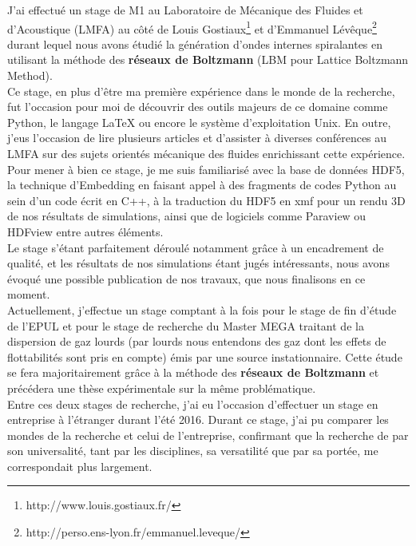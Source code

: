 \documentclass[french, lmr]{article}
\begin{document}
\hspace{4 mm }J'ai effectué un stage de M1 au Laboratoire de Mécanique des Fluides et d'Acoustique (\textsc{LMFA}) au côté de Louis Gostiaux\footnote{http://www.louis.gostiaux.fr/} et d'Emmanuel Lévêque\footnote{http://perso.ens-lyon.fr/emmanuel.leveque/} durant lequel nous avons étudié la génération d'ondes internes spiralantes en utilisant la méthode des \textbf{réseaux de Boltzmann} (LBM pour Lattice Boltzmann Method). \\ 
Ce stage, en plus d'être ma première expérience dans le monde de la recherche, fut l'occasion pour moi de découvrir des outils majeurs de ce domaine comme Python, le langage \LaTeX $ $ ou encore le système d'exploitation Unix. En outre, j'eus l'occasion de lire plusieurs articles et d'assister à diverses conférences au LMFA sur des sujets orientés mécanique des fluides enrichissant cette expérience. \\ 
Pour mener à bien ce stage, je me suis familiarisé avec la base de données \textsc{HDF5}, la technique d'Embedding en faisant appel à des fragments de codes Python au sein d'un code écrit en C++, à la traduction du \textsc{HDF5} en xmf pour un rendu 3D de nos résultats de simulations, ainsi que de logiciels comme Paraview ou HDFview entre autres éléments.\\
 Le stage s'étant parfaitement déroulé notamment grâce à un encadrement de qualité, et les résultats de nos simulations étant jugés intéressants, nous avons évoqué une possible publication de nos travaux, que nous finalisons en ce moment. \\
Actuellement, j'effectue un stage comptant à la fois pour le stage de fin d'étude de l'\textsc{EPUL} et pour le stage de recherche du Master \textsc{MEGA} traitant de la dispersion de gaz lourds (par lourds nous entendons des gaz dont les effets de flottabilités sont pris en compte) émis par une source instationnaire. Cette étude se fera majoritairement grâce à la méthode des \textbf{réseaux de Boltzmann} et précédera une thèse expérimentale sur la même problématique. \\
Entre ces deux stages de recherche, j'ai eu l'occasion d'effectuer un stage en entreprise à l'étranger durant l'été 2016. Durant ce stage, j'ai pu comparer les mondes de la recherche et celui de l'entreprise, confirmant que la recherche de par son universalité, tant par les disciplines, sa versatilité que par sa portée, me correspondait plus largement.  \\
\end{document}
